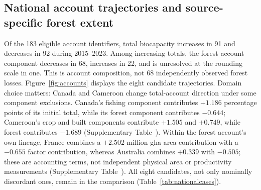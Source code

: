 \documentclass[11pt,a4paper]{article}
\begin{document}
\subsection{National account trajectories and source-specific forest extent}\label{sec:nationalresults}
Of the 183 eligible account identifiers, total biocapacity increases in 91 and decreases in 92 during 2015--2023. Among increasing totals, the forest account component decreases in 68, increases in 22, and is unresolved at the rounding scale in one. This is account composition, not 68 independently observed forest losses. Figure~\ref{fig:accounts} displays the eight candidate trajectories. Domain choice matters: Canada and Cameroon change total-account direction under some component exclusions. Canada's fishing component contributes $+1.186$ percentage points of its initial total, while its forest component contributes $-0.644$; Cameroon's crop and built components contribute $+1.505$ and $+0.749$, while forest contributes $-1.689$ (Supplementary Table~). Within the forest account's own lineage, France combines a $+2.502$ million-gha area contribution with a $-0.655$ factor contribution, whereas Australia combines $+0.339$ with $-0.505$; these are accounting terms, not independent physical area or productivity measurements (Supplementary Table~). All eight candidates, not only nominally discordant ones, remain in the comparison (Table~\ref{tab:nationalcases}).
\end{document}
